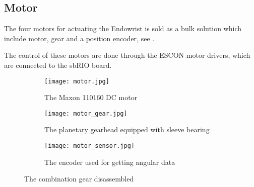 \subsection{Motor}\label{Maxon_Motor}
The four motors for actuating the Endowrist is sold as a bulk solution which include motor\cite{motor_motor}, gear\cite{motor_gear} and a position encoder\cite{motor_encoder}, see .

The control of these motors are done through the ESCON motor drivers, which are connected to the sbRIO board.


\begin{figure}[H]
	\centering
	\begin{subfigure}{.32\textwidth}
		\vspace{0pt}
		\centering
		\texttt{[image: motor.jpg]}
		\caption{The Maxon 110160 \newline DC motor}
		\label{fig:motor}
	\end{subfigure}
	\begin{subfigure}{.32\textwidth}
		\centering
		\texttt{[image: motor\_gear.jpg]}
		\caption{The planetary gearhead equipped with sleeve bearing}
		\label{fig:motor_gear}
	\end{subfigure}
	\begin{subfigure}{.32\textwidth}
		\centering
		\texttt{[image: motor\_sensor.jpg]}
		\caption{The encoder used for getting angular data}
		\label{fig:motor_sensor}
	\end{subfigure}
	\caption{The combination gear disassembled}
	\label{fig:Full_motor _dis}
\end{figure}

